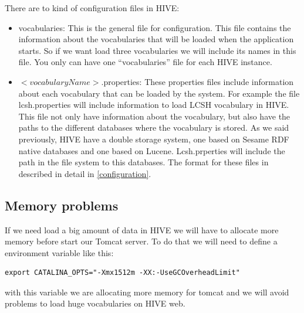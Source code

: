 There are to kind of configuration files in HIVE:

\begin{itemize}
 \item vocabularies: This is the general file for configuration. This file contains the information about the vocabularies that will 
be loaded when the application starts. So if we want load three vocabularies we will include its names in this file. You only can have 
one “vocabularies” file for each HIVE instance.
 \item $<vocabularyName>$.properties: These properties files include information about each vocabulary that can be loaded by the system. 
For example the file lcsh.properties will include information to load LCSH vocabulary in HIVE. This file not only have information about 
the vocabulary, but also have the paths to the different databases where the vocabulary is stored. As we said previously, HIVE have a 
double storage system, one based on Sesame RDF native databases and one based on Lucene. Lcsh.prperties will include the path in the 
file system to this databases. The format for these files in described in detail in \ref{configuration}.
\end{itemize}

\subsection{Memory problems}

If we need load a big amount of data in HIVE we will have to allocate more memory before start our Tomcat server.
To do that we will need to define a environment variable like this:

\begin{verbatim}
export CATALINA_OPTS="-Xmx1512m -XX:-UseGCOverheadLimit"
\end{verbatim}

with this variable we are allocating more memory for tomcat and we will avoid problems to load huge vocabularies on HIVE web.